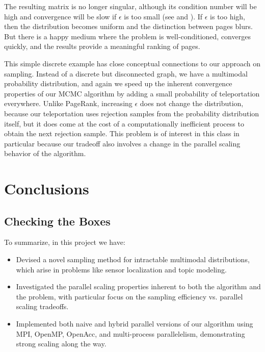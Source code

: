 \documentclass{article}
\begin{document}
The resulting matrix is no longer singular, although its condition number will
be high and convergence will be slow if $\epsilon$ is too small (see
\cite{convspeed} and \cite{secondeig}). If $\epsilon$ is too high, then the
distribution becomes uniform and the distinction between pages blurs. But there
is a happy medium where the problem is well-conditioned, converges quickly, and
the results provide a meaningful ranking of pages.

This simple discrete example has close conceptual connections to our approach
on sampling. Instead of a discrete but disconnected graph, we have a multimodal
probability distribution, and again we speed up the inherent convergence
properties of our MCMC algorithm by adding a small probability of teleportation
everywhere. Unlike PageRank, increasing $\epsilon$ does not change the
distribution, because our teleportation uses rejection samples from the
probability distribution itself, but it does come at the cost of a
computationally inefficient process to obtain the next rejection sample. This
problem is of interest in this class in particular because our tradeoff also
involves a change in the parallel scaling behavior of the algorithm.

\section{Conclusions}

\subsection{Checking the Boxes}

To summarize, in this project we have:

\begin{itemize}

\item Devised a novel sampling method for intractable multimodal
  distributions, which arise in problems like sensor localization and topic
  modeling.

\item Investigated the parallel scaling properties inherent to both the
  algorithm and the problem, with particular focus on the sampling efficiency
  vs. parallel scaling tradeoffs.

\item  Implemented both naive and hybrid parallel versions of our algorithm
  using MPI, OpenMP, OpenAcc, and multi-process parallelelism, demonstrating
  strong scaling along the way.

\end{itemize}
\end{document}
